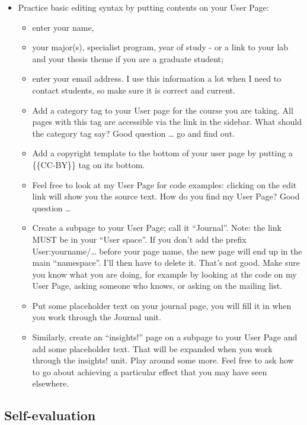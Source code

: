 \documentclass[]{book}
\providecommand{\tightlist}{%
  \setlength{\itemsep}{0pt}\setlength{\parskip}{0pt}}
\begin{document}
\begin{itemize}
\tightlist
\item
  Practice basic editing syntax by putting contents on your User Page:

  \begin{itemize}
  \tightlist
  \item
    enter your name,
  \item
    your major(s), specialist program, year of study - or a link to your
    lab and your thesis theme if you are a graduate student;
  \item
    enter your email address. I use this information a lot when I need
    to contact students, so make sure it is correct and current.
  \item
    Add a category tag to your User page for the course you are taking.
    All pages with this tag are accessible via the link in the sidebar.
    What should the category tag say? Good question \ldots{} go and find
    out.
  \item
    Add a copyright template to the bottom of your user page by putting
    a \{\{CC-BY\}\} tag on its bottom.
  \item
    Feel free to look at my User Page for code examples: clicking on the
    edit link will show you the source text. How do you find my User
    Page? Good question \ldots{}
  \item
    Create a subpage to your User Page; call it ``Journal''. Note: the
    link MUST be in your ``User space''. If you don't add the prefix
    User:yourname/\ldots{} before your page name, the new page will end
    up in the main ``namespace''. I'll then have to delete it. That's
    not good. Make sure you know what you are doing, for example by
    looking at the code on my User Page, asking someone who knows, or
    asking on the mailing list.
  \item
    Put some placeholder text on your journal page, you will fill it in
    when you work through the Journal unit.
  \item
    Similarly, create an ``insights!'' page on a subpage to your User
    Page and add some placeholder text. That will be expanded when you
    work through the insights! unit. Play around some more. Feel free to
    ask how to go about achieving a particular effect that you may have
    seen elsewhere.
  \end{itemize}
\end{itemize}

\subsection{Self-evaluation}\label{self-evaluation}
\end{document}
